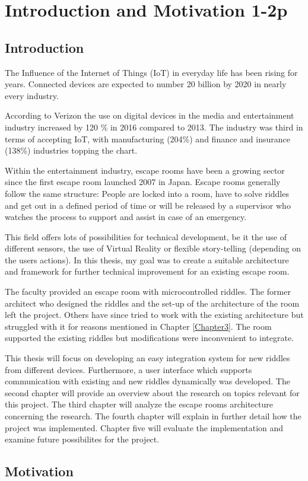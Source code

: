 
\chapter{Introduction and Motivation 1-2p} %

\label{Chapter1} %


\section{Introduction}

The Influence of the Internet of Things (IoT) in everyday life has been rising for years.
Connected devices are expected to number 20 billion \parencite{gartner0} by 2020 in nearly every industry.

According to Verizon \parencite{verizon} the use on digital devices in the media and entertainment industry increased by 120 \% in 2016 compared to 2013.
The industry was third in terms of accepting IoT,
with manufacturing (204\%) and finance and insurance (138\%) industries topping the chart.

Within the entertainment industry, escape rooms have been a growing sector since the first escape room launched 2007 in Japan.
Escape rooms generally follow the same structure: People are locked into a room, have to solve riddles
and get out in a defined period of time or will be released by a supervisor who watches the process to support
and assist in case of an emergency.

This field offers lots of possibilities for technical development, be it the use of different sensors, the use of Virtual Reality or flexible story-telling (depending on the users actions).
In this thesis, my goal was to create a suitable architecture and framework for further technical improvement for an existing escape room.

The faculty provided an escape room with microcontrolled riddles.
The former architect who designed the riddles and the set-up of the architecture of the room left the project.
Others have since tried to work with the existing architecture but struggled with it for reasons mentioned in Chapter \ref{Chapter3}.
The room supported the existing riddles but modifications were inconvenient to integrate.

This thesis will focus on developing an easy integration system for new riddles from different devices.
Furthermore, a user interface which supports communication with existing and new riddles dynamically was developed.
The second chapter will provide an overview about the research on topics relevant for this project. 
The third chapter will analyze the escape rooms architecture concerning the research. 
The fourth chapter will explain in further detail how the project was implemented. 
Chapter five will evaluate the implementation and examine future possibilites for the project.

\section{Motivation}